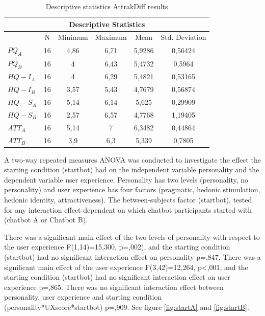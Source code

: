 \begin{table}[h]
\centering
\begin{tabular}{lccccc}
\hline
\multicolumn{6}{c}{\textbf{Descriptive Statistics}} \\
\hline
& N & Minimum & Maximum & Mean & Std. Deviation \\
$PQ_A$ & 16 & 4,86 & 6,71 & 5,9286 & 0,56424 \\
$PQ_B$ & 16 & 4 & 6,43 & 5,4732 & 0,5964 \\
$HQ-I_A$ & 16 & 4 & 6,29 & 5,4821 & 0,53165 \\
$HQ-I_B$ & 16 & 3,57 & 5,43 & 4,7679 & 0,56874 \\
$HQ-S_A$ & 16 & 5,14 & 6,14 & 5,625 & 0,29909 \\
$HQ-S_B$ & 16 & 2,57 & 6,57 & 4,7768 & 1,19405 \\
$ATT_A$ & 16 & 5,14 & 7 & 6,3482 & 0,44864 \\
$ATT_B$ & 16 & 3,9 & 6,3 & 5,339 & 0,7805 \\
\end{tabular}
\caption{Descriptive statistics AttrakDiff results}
 \label{table:6}
    \end{table}

A two-way repeated measures ANOVA was conducted to investigate the effect the starting condition (startbot) had on the independent variable personality and the dependent variable user experience. Personality has two levels (personality, no personality) and user experience has four factors (pragmatic, hedonic stimulation, hedonic identity, attractiveness). The between-subjects factor (startbot), tested for any interaction effect dependent on which chatbot participants started with (chatbot A or Chatbot B).

There was a significant main effect of the two levels of personality with respect to the user experience F(1,14)=15,300, p=,002), and the starting condition (startbot) had no significant interaction effect on personality p=,847. There was a significant main effect of the user experience F(3,42)=12,264, p<,001, and the starting condition (startbot) had no significant interaction effect on user experience p=,865. There was no significant interaction effect between personality, user experience and starting condition (personality*UXscore*startbot) p=,909. See figure \ref{fig:startA} and \ref{fig:startB}.

